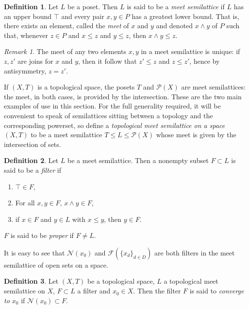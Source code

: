 \documentclass{book}
\theoremstyle{definition}
\newtheorem{definition}{Definition}[section]
\theoremstyle{remark}
\newtheorem{remark}{Remark}[section]
\newcommand{\neigh}[1]{\mathcal N(#1)}
\newcommand{\filt}[1]{\mathcal F(#1)}
\begin{document}
\begin{definition}
Let $L$ be a poset. Then $L$ is said to be a \textit{meet semilattice} if $L$ has an upper bound $\top$ and every pair $x,y\in P$ has a greatest lower bound. That is, there exists an element, called the \textit{meet} of $x$ and $y$ and denoted $x\wedge y$ of $P$ such that, whenever $z\in P$ and $x\leq z$ and $y\leq z$, then $x\wedge y\leq z$.
\end{definition}

\begin{remark}
The meet of any two elements $x,y$ in a meet semilattice is unique: if $z,z'$ are joins for $x$ and $y$, then it follow that $z'\leq z$ and $z\leq z'$, hence by antisymmetry, $z=z'$.
\end{remark}

If $(X,T)$ is a topological space, the posets $T$ and $\mathcal P(X)$ are meet semilattices: the meet, in both cases, is provided by the intersection. These are the two main examples of use in this section. For the full generality required, it will be convenient to speak of semilattices sitting between a topology and the corresponding powerset, so define a \textit{topological meet semilattice on a space $(X, T)$} to be a meet semilattice $T\leq L\leq\mathcal P(X)$ whose meet is given by the intersection of sets.

\begin{definition}
Let $L$ be a meet semilattice. Then a nonempty subset $F\subset L$ is said to be a \textit{filter} if
\begin{enumerate}
    \item $\top\in F$,
    \item For all $x,y\in F$, $x\wedge y\in F$,
    \item if $x\in F$ and $y\in L$ with $x\leq y$, then $y\in F$.
\end{enumerate}
$F$ is said to be \textit{proper} if $F\neq L$.
\end{definition}

It is easy to see that $\neigh{x_0}$ and $\filt{\{x_d\}_{d\in D}}$ are both filters in the meet semilattice of open sets on a space.

\begin{definition}
Let $(X,T)$ be a topological space, $L$ a topological meet semilattice on $X$, $F\subset L$ a filter and $x_0\in X$. Then the filter $F$ is said to \textit{converge to $x_0$} if $\neigh{x_0}\subset F$.
\end{definition}
\end{document}
